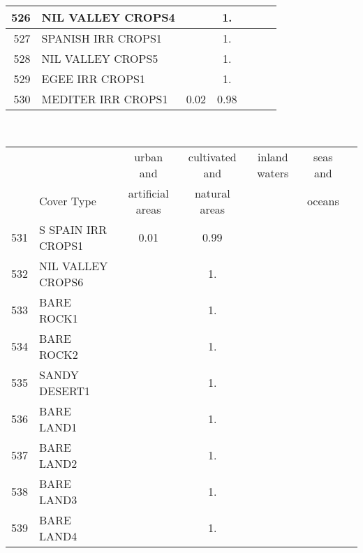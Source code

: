 {{\begin{tabular}{||r|l||c|c|c|c|c||}
 \hline
         526  & NIL VALLEY CROPS4                                            &       &  1.   &       &       \\
 \hline
         527  & SPANISH IRR CROPS1                                           &       &  1.   &       &       \\
 \hline
         528  & NIL VALLEY CROPS5                                            &       &  1.   &       &       \\
 \hline
         529  & EGEE IRR CROPS1                                              &       &  1.   &       &       \\
 \hline
         530  & MEDITER IRR CROPS1                                           &  0.02 &  0.98 &       &       \\
 \hline
 \end{tabular}
 \clearpage
 \medskip\
 \begin{tabular}{||r|l||c|c|c|c|c||}
 \hline
 \hline
 && urban and & cultivated and &inland waters&seas and\\
 &Cover Type& artificial areas & natural areas&&oceans\\
 \hline
 \hline
         531  & S SPAIN IRR CROPS1                                           &  0.01 &  0.99 &       &       \\
 \hline
         532  & NIL VALLEY CROPS6                                            &       &  1.   &       &       \\
 \hline
         533  & BARE ROCK1                                                   &       &  1.   &       &       \\
 \hline
         534  & BARE ROCK2                                                   &       &  1.   &       &       \\
 \hline
         535  & SANDY DESERT1                                                &       &  1.   &       &       \\
 \hline
         536  & BARE LAND1                                                   &       &  1.   &       &       \\
 \hline
         537  & BARE LAND2                                                   &       &  1.   &       &       \\
 \hline
         538  & BARE LAND3                                                   &       &  1.   &       &       \\
 \hline
         539  & BARE LAND4                                                   &       &  1.   &       &       \\

\end{tabular}}}
